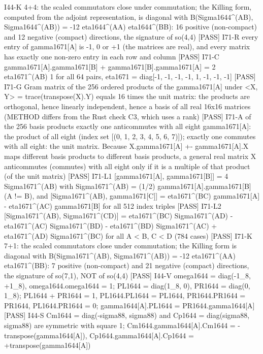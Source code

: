 \documentclass[
  10pt,
]{article}
\newenvironment{Shaded}{}{}
\newcommand{\NormalTok}[1]{#1}
\begin{document}
\begin{Shaded}
\begin{Highlighting}[]
\NormalTok{[PASS] I44{-}K   4+4: the scaled commutators close under commutation; the Killing form, computed from the adjoint representation, is diagonal with B(Sigma1644\^{}(AB), Sigma1644\^{}(AB)) = {-}12 eta1644\^{}(AA) eta1644\^{}(BB): 16 positive (non{-}compact) and 12 negative (compact) directions, the signature of so(4,4)}
\NormalTok{[PASS] I71{-}R   every entry of gamma1671[A] is {-}1, 0 or +1 (the matrices are real), and every matrix has exactly one non{-}zero entry in each row and column}
\NormalTok{[PASS] I71{-}C   gamma1671[A].gamma1671[B] + gamma1671[B].gamma1671[A] = 2 eta1671\^{}(AB) 1 for all 64 pairs, eta1671 = diag[{-}1, {-}1, {-}1, {-}1, 1, {-}1, {-}1, {-}1]}
\NormalTok{[PASS] I71{-}G   Gram matrix of the 256 ordered products of the gamma1671[A] under \textless{}X, Y\textgreater{} = trace(transpose(X).Y) equals 16 times the unit matrix: the products are orthogonal, hence linearly independent, hence a basis of all real 16x16 matrices (METHOD differs from the Rust check C3, which uses a rank)}
\NormalTok{[PASS] I71{-}A   of the 256 basis products exactly one anticommutes with all eight gamma1671[A]: the product of all eight (index set [(0, 1, 2, 3, 4, 5, 6, 7)]); exactly one commutes with all eight: the unit matrix.  Because X.gamma1671[A] +{-} gamma1671[A].X maps different basis products to different basis products, a general real matrix X anticommutes (commutes) with all eight only if it is a multiple of that product (of the unit matrix)}
\NormalTok{[PASS] I71{-}L1  [gamma1671[A], gamma1671[B]] = 4 Sigma1671\^{}(AB) with Sigma1671\^{}(AB) = (1/2) gamma1671[A].gamma1671[B] (A != B), and [Sigma1671\^{}(AB), gamma1671[C]] = eta1671\^{}(BC) gamma1671[A] {-} eta1671\^{}(AC) gamma1671[B] for all 512 index triples}
\NormalTok{[PASS] I71{-}L2  [Sigma1671\^{}(AB), Sigma1671\^{}(CD)] = eta1671\^{}(BC) Sigma1671\^{}(AD) {-} eta1671\^{}(AC) Sigma1671\^{}(BD) {-} eta1671\^{}(BD) Sigma1671\^{}(AC) + eta1671\^{}(AD) Sigma1671\^{}(BC) for all A \textless{} B, C \textless{} D (784 cases)}
\NormalTok{[PASS] I71{-}K   7+1: the scaled commutators close under commutation; the Killing form is diagonal with B(Sigma1671\^{}(AB), Sigma1671\^{}(AB)) = {-}12 eta1671\^{}(AA) eta1671\^{}(BB): 7 positive (non{-}compact) and 21 negative (compact) directions, the signature of so(7,1), NOT of so(4,4)}
\NormalTok{[PASS] I44{-}V   omega1644 = diag({-}1\_8, +1\_8), omega1644.omega1644 = 1; PL1644 = diag(1\_8, 0), PR1644 = diag(0, 1\_8); PL1644 + PR1644 = 1, PL1644.PL1644 = PL1644, PR1644.PR1644 = PR1644, PL1644.PR1644 = 0; gamma1644[A].PL1644 = PR1644.gamma1644[A]}
\NormalTok{[PASS] I44{-}S   Cm1644 = diag({-}sigma88, sigma88) and Cp1644 = diag(sigma88, sigma88) are symmetric with square 1; Cm1644.gamma1644[A].Cm1644 = {-}transpose(gamma1644[A]), Cp1644.gamma1644[A].Cp1644 = +transpose(gamma1644[A])}

\end{Highlighting}
\end{Shaded}
\end{document}
